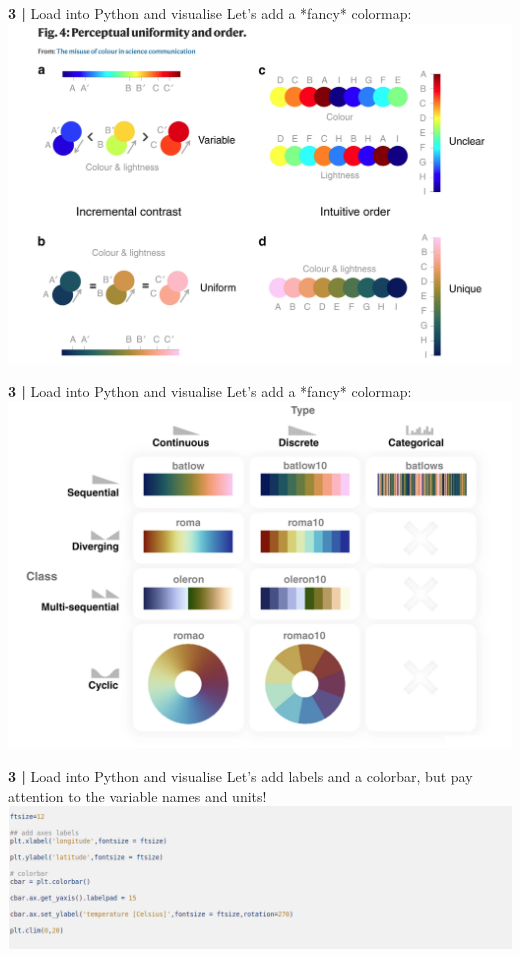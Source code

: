  
\begin{frame}{\textbf{3 |} Load into Python and visualise} 
    Let's add a *fancy* colormap:\\
        \vspace{0.5cm}
    \includegraphics[scale=0.20]{images/Colormap_2.png}
\end{frame}
  
\begin{frame}{\textbf{3 |} Load into Python and visualise} 
    Let's add a *fancy* colormap:\\
        \vspace{0.5cm}
    \includegraphics[scale=0.20]{images/Colormap_3.png}
\end{frame}
  
  
 
\begin{frame}{\textbf{3 |} Load into Python and visualise} 
    Let's add labels and a colorbar, but pay attention to the variable names and units!
        \vspace{0.5cm}
    \includegraphics[scale=0.35]{images/Script1_step6.png}
\end{frame}
 
